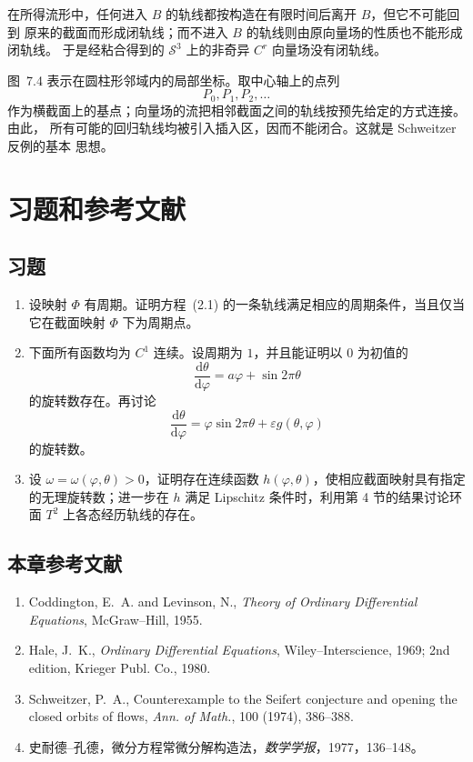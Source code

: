 
在所得流形中，任何进入 $B$ 的轨线都按构造在有限时间后离开 $B$，但它不可能回到
原来的截面而形成闭轨线；而不进入 $B$ 的轨线则由原向量场的性质也不能形成闭轨线。
于是经粘合得到的 $\mathscr S^3$ 上的非奇异 $C^r$ 向量场没有闭轨线。


图~7.4 表示在圆柱形邻域内的局部坐标。取中心轴上的点列
\[
  P_0,P_1,P_2,\ldots
\]
作为横截面上的基点；向量场的流把相邻截面之间的轨线按预先给定的方式连接。由此，
所有可能的回归轨线均被引入插入区，因而不能闭合。这就是 Schweitzer 反例的基本
思想。

\section*{习题和参考文献}
\subsection*{习题}

\begin{enumerate}
  \item 设映射 $\Phi$ 有周期。证明方程~(2.1) 的一条轨线满足相应的周期条件，当且仅当
  它在截面映射 $\Phi$ 下为周期点。
  \item 下面所有函数均为 $C^1$ 连续。设周期为 $1$，并且能证明以 $0$ 为初值的
  \[
    \frac{\mathrm d\theta}{\mathrm d\varphi}
    =a\varphi+\sin2\pi\theta
  \]
  的旋转数存在。再讨论
  \[
    \frac{\mathrm d\theta}{\mathrm d\varphi}
    =\varphi\sin2\pi\theta+\varepsilon g(\theta,\varphi)
  \]
  的旋转数。
  \item 设 $\omega=\omega(\varphi,\theta)>0$，证明存在连续函数
  $h(\varphi,\theta)$，使相应截面映射具有指定的无理旋转数；进一步在
  $h$ 满足 Lipschitz 条件时，利用第 4 节的结果讨论环面 $T^2$ 上各态经历轨线的存在。
\end{enumerate}

\subsection*{本章参考文献}
\begin{enumerate}
  \item Coddington, E.~A. and Levinson, N., \textit{Theory of Ordinary Differential Equations},
  McGraw--Hill, 1955.
  \item Hale, J.~K., \textit{Ordinary Differential Equations}, Wiley--Interscience, 1969;
  2nd edition, Krieger Publ. Co., 1980.
  \item Schweitzer, P.~A., Counterexample to the Seifert conjecture and opening the closed
  orbits of flows, \textit{Ann. of Math.}, 100 (1974), 386--388.
  \item 史耐德--孔德，微分方程常微分解构造法，\textit{数学学报}，1977，136--148。
\end{enumerate}

\endinput
